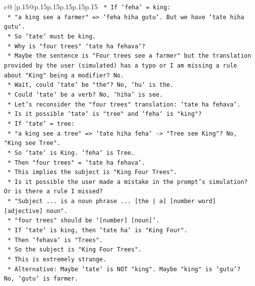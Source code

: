 \documentclass{article}
\begin{document}
{\begin{supertabular}{c@{$\;$}|p{.15\linewidth}@{}p{.15\linewidth}p{.15\linewidth}p{.15\linewidth}p{.15\linewidth}p{.15\linewidth}}
{{{\texttt{        *   If `feha` = king:} \\
\texttt{            *   "a king see a farmer" => `feha hiha gutu`. But we have `tate hiha gutu`.} \\
\texttt{            *   So `tate` must be king.} \\
\texttt{        *   Why is "four trees" `tate ha fehava`?} \\
\texttt{        *   Maybe the sentence is "Four trees see a farmer" but the translation provided by the user (simulated) has a typo or I am missing a rule about "King" being a modifier? No.} \\
\texttt{        *   Wait, could `tate` be "the"? No, `hu` is the.} \\
\texttt{        *   Could `tate` be a verb? No, `hiha` is see.} \\
\texttt{        *   Let's reconsider the "four trees" translation: `tate ha fehava`.} \\
\texttt{        *   Is it possible `tate` is "tree" and `feha` is "king"?} \\
\texttt{        *   If `tate` = tree:} \\
\texttt{            *   "a king see a tree" => `tate hiha feha` {-}> "Tree see King"? No, "King see Tree".} \\
\texttt{            *   So `tate` is King. `feha` is Tree.} \\
\texttt{        *   Then "four trees" = `tate ha fehava`.} \\
\texttt{        *   This implies the subject is "King Four Trees".} \\
\texttt{        *   Is it possible the user made a mistake in the prompt's simulation? Or is there a rule I missed?} \\
\texttt{        *   "Subject ... is a noun phrase ... {[}the | a{]} {[}number word{]} {[}adjective{]} noun".} \\
\texttt{        *   "four trees" should be `{[}number{]} {[}noun{]}`.} \\
\texttt{        *   If `tate` is king, then `tate ha` is "King Four".} \\
\texttt{        *   Then `fehava` is "Trees".} \\
\texttt{        *   So the subject is "King Four Trees".} \\
\texttt{        *   This is extremely strange.} \\
\texttt{        *   Alternative: Maybe `tate` is NOT "king". Maybe "king" is `gutu`? No, `gutu` is farmer.} \\
}}}
\end{supertabular}}
\end{document}

